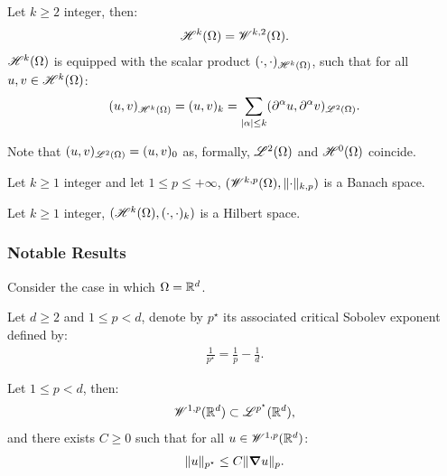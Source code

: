 \begin{definition}
    Let $k \geq 2$ integer, then:
    \begin{align}
        \mathscr{H}^{k}(\Omega) = \mathscr{W}^{k, 2}(\Omega).
    \end{align}
    $\mathscr{H}^{k}(\Omega)$ is equipped with the scalar product $(\cdot, \cdot)_{\mathscr{H}^{k}(\Omega)}$, such that for all $u, v \in \mathscr{H}^{k}(\Omega)$:
    \begin{align}
        (u, v)_{\mathscr{H}^{k}(\Omega)} = (u, v)_k = \sum_{\lvert \alpha \rvert \leq k} (\partial^{\alpha} u, \partial^{\alpha} v)_{\mathscr{L}^{2}(\Omega)}.
    \end{align}
\end{definition}

Note that $(u, v)_{\mathscr{L}^{2}(\Omega)} = (u, v)_0$ as, formally, $\mathscr{L}^{2}(\Omega)$ and $\mathscr{H}^{0}(\Omega)$ coincide. %

\begin{remark}
    Let $k \geq 1$ integer and let $1 \leq p \leq +\infty$, $(\mathscr{W}^{k, p}(\Omega), \lVert \cdot \rVert_{k, p})$ is a Banach space.
\end{remark}

\begin{remark}
    Let $k \geq 1$ integer, $(\mathscr{H}^{k}(\Omega), (\cdot, \cdot)_k)$ is a Hilbert space.
\end{remark}

\subsubsection{Notable Results}

Consider the case in which $\Omega = \mathbb{R}^{d}$.

\begin{definition}
    Let $d \geq 2$ and $1 \leq p < d$, denote by $p^{\star}$ its associated critical Sobolev exponent defined by:
    \begin{align}
        \frac{1}{p^{\star}} = \frac{1}{p} - \frac{1}{d}.
    \end{align}
\end{definition}

\begin{theorem}
    Let $1 \leq p < d$, then:
    \begin{align}
        \mathscr{W}^{1, p}(\mathbb{R}^{d}) \subset \mathscr{L}^{p^{\star}}(\mathbb{R}^{d}),
    \end{align}
    and there exists $C \geq 0$ such that for all $u \in \mathscr{W}^{1, p}(\mathbb{R}^{d})$:
    \begin{align}
        \lVert u \rVert_{p^{\star}} \leq C \lVert \bm{\nabla} u \rVert_p.
    \end{align}
\end{theorem}

